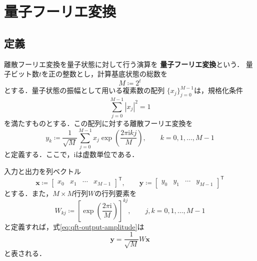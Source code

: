 \section{量子フーリエ変換}
\label{sec:quantum-fourier-transform}

\subsection{定義}
\label{subsec:qft-definition}

離散フーリエ変換を量子状態に対して行う演算を
\textbf{量子フーリエ変換}という\cite{shimada2020}．
量子ビット数$t$を正の整数とし，計算基底状態の総数を
\begin{equation}
  M
  \coloneq
  2^t
  \label{eq:qft-dimension}
\end{equation}
とする．量子状態の振幅として用いる複素数の配列
$\{x_j\}_{j=0}^{M-1}$は，規格化条件
\begin{equation}
  \sum_{j=0}^{M-1}|x_j|^2
  =
  1
  \label{eq:qft-amplitude-normalization}
\end{equation}
を満たすものとする．この配列に対する離散フーリエ変換を
\begin{equation}
  y_k
  \coloneq
  \frac{1}{\sqrt{M}}
  \sum_{j=0}^{M-1}
  x_j
  \exp\left(
    \frac{2\pi\mathrm{i}kj}{M}
  \right),
  \qquad
  k=0,1,\ldots,M-1
  \label{eq:qft-output-amplitude}
\end{equation}
と定義する．ここで，$\mathrm{i}$は虚数単位である．

入力と出力を列ベクトル
\begin{equation}
  \bm{x}
  \coloneq
  \begin{bmatrix}
    x_0 & x_1 & \cdots & x_{M-1}
  \end{bmatrix}^{\mathsf{T}},
  \qquad
  \bm{y}
  \coloneq
  \begin{bmatrix}
    y_0 & y_1 & \cdots & y_{M-1}
  \end{bmatrix}^{\mathsf{T}}
  \label{eq:qft-vector-definitions}
\end{equation}
とする．また，$M\times M$行列$W$の行列要素を
\begin{equation}
  W_{kj}
  \coloneq
  \left[
    \exp\left(
      \frac{2\pi\mathrm{i}}{M}
    \right)
  \right]^{kj},
  \qquad
  j,k=0,1,\ldots,M-1
  \label{eq:qft-fourier-matrix-elements}
\end{equation}
と定義すれば，式\eqref{eq:qft-output-amplitude}は
\begin{equation}
  \bm{y}
  =
  \frac{1}{\sqrt{M}}W\bm{x}
  \label{eq:qft-matrix-form}
\end{equation}
と表される．

